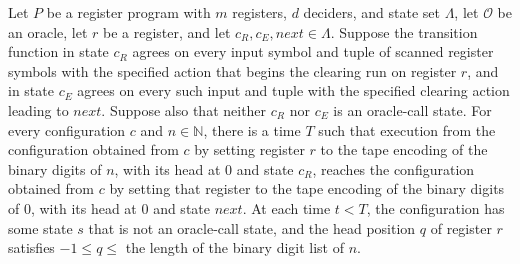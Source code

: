 \begin{lemma}
\label{Complexity.LogProg.clr_run}
\leanok
{}
Let $P$ be a register program with $m$ registers, $d$ deciders, and state set $\Lambda$,
let $\mathcal O$ be an oracle, let $r$ be a register, and let
$c_R,c_E,\mathit{next}\in\Lambda$. Suppose the transition function in state $c_R$ agrees
on every input symbol and tuple of scanned register symbols with the specified action
that begins the clearing run on register $r$, and in state $c_E$ agrees on every such
input and tuple with the specified clearing action leading to $\mathit{next}$. Suppose
also that neither $c_R$ nor $c_E$ is an oracle-call state. For every configuration $c$
and $n\in\mathbb{N}$, there is a time $T$ such that execution from the configuration
obtained from $c$ by setting register $r$ to the tape encoding of the binary digits of
$n$, with its head at $0$ and state $c_R$, reaches the configuration obtained from $c$
by setting that register to the tape encoding of the binary digits of $0$, with its head
at $0$ and state $\mathit{next}$. At each time $t<T$, the configuration has some state
$s$ that is not an oracle-call state, and the head position $q$ of register $r$
satisfies $-1\le q\le$ the length of the binary digit list of $n$.
\end{lemma}
